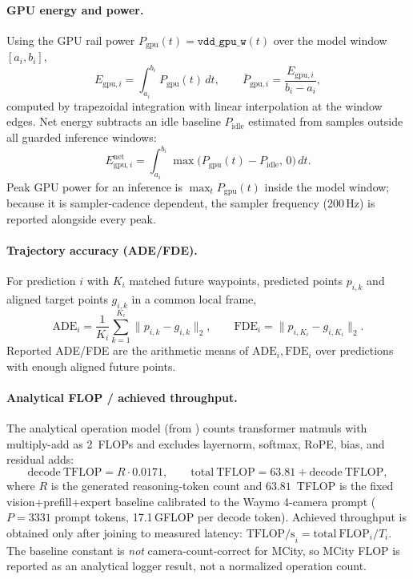 \documentclass[11pt,a4paper]{article}
\newcommand{\code}[1]{\texttt{\small\detokenize{#1}}}
\begin{document}
\paragraph{GPU energy and power.} Using the GPU rail power
$P_\mathrm{gpu}(t)=\texttt{vdd\_gpu\_w}(t)$ over the model window $[a_i,b_i]$,
\begin{equation}
E_{\mathrm{gpu},i} = \int_{a_i}^{b_i} P_\mathrm{gpu}(t)\,dt,
\qquad
\bar{P}_{\mathrm{gpu},i} = \frac{E_{\mathrm{gpu},i}}{b_i-a_i},
\end{equation}
computed by trapezoidal integration with linear interpolation at the window
edges. Net energy subtracts an idle baseline $P_\mathrm{idle}$ estimated from
samples outside all guarded inference windows:
\begin{equation}
E^{\mathrm{net}}_{\mathrm{gpu},i} = \int_{a_i}^{b_i} \max\!\big(P_\mathrm{gpu}(t)-P_\mathrm{idle},\,0\big)\,dt .
\end{equation}
Peak GPU power for an inference is $\max_t P_\mathrm{gpu}(t)$ inside the model
window; because it is sampler-cadence dependent, the sampler frequency
(200\,Hz) is reported alongside every peak.

\paragraph{Trajectory accuracy (ADE/FDE).} For prediction $i$ with $K_i$ matched
future waypoints, predicted points $p_{i,k}$ and aligned target points $g_{i,k}$
in a common local frame,
\begin{equation}
\mathrm{ADE}_i = \frac{1}{K_i}\sum_{k=1}^{K_i}\lVert p_{i,k}-g_{i,k}\rVert_2,
\qquad
\mathrm{FDE}_i = \lVert p_{i,K_i}-g_{i,K_i}\rVert_2 .
\end{equation}
Reported ADE/FDE are the arithmetic means of $\mathrm{ADE}_i,\mathrm{FDE}_i$
over predictions with enough aligned future points.

\paragraph{Analytical FLOP / achieved throughput.} The analytical operation
model (from \code{scripts/flop_model.py}) counts transformer matmuls with
multiply-add as 2~FLOPs and excludes layernorm, softmax, RoPE, bias, and
residual adds:
\begin{equation}
\mathrm{decode\ TFLOP} = R\cdot 0.0171,
\qquad
\mathrm{total\ TFLOP} = 63.81 + \mathrm{decode\ TFLOP},
\end{equation}
where $R$ is the generated reasoning-token count and $63.81$~TFLOP is the fixed
vision+prefill+expert baseline calibrated to the Waymo 4-camera prompt
($P=3331$ prompt tokens, 17.1\,GFLOP per decode token). Achieved throughput is
obtained only after joining to measured latency:
$\mathrm{TFLOP/s}_i = \mathrm{total\ FLOP}_i / T_i$. The baseline constant is
\emph{not} camera-count-correct for MCity, so MCity FLOP is reported as an
analytical logger result, not a normalized operation count.
\end{document}
